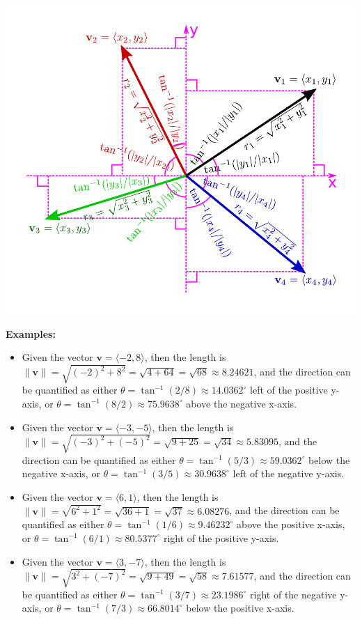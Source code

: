 \documentclass{article}
\begin{document}
\includegraphics[width = \textwidth]{cartesian_vector_to_polar_vector}

\textbf{Examples:}
\begin{itemize}
\item Given the vector \(\mathbf{v} = \langle -2, 8 \rangle\), then the length is \(\|\mathbf{v}\| = \sqrt{(-2)^2 + 8^2} = \sqrt{4 + 64} = \sqrt{68} \approx 8.24621\), and the direction can be quantified as either \(\theta = \tan^{-1}(2/8) \approx 14.0362^\circ\) left of the positive y-axis, or \(\theta = \tan^{-1}(8/2) \approx 75.9638^\circ\) above the negative x-axis.
\item Given the vector \(\mathbf{v} = \langle -3, -5 \rangle\), then the length is \(\|\mathbf{v}\| = \sqrt{(-3)^2 + (-5)^2} = \sqrt{9 + 25} = \sqrt{34} \approx 5.83095\), and the direction can be quantified as either \(\theta = \tan^{-1}(5/3) \approx 59.0362^\circ\) below the negative x-axis, or \(\theta = \tan^{-1}(3/5) \approx 30.9638^\circ\) left of the negative y-axis.
\item Given the vector \(\mathbf{v} = \langle 6, 1 \rangle\), then the length is \(\|\mathbf{v}\| = \sqrt{6^2 + 1^2} = \sqrt{36 + 1} = \sqrt{37} \approx 6.08276\), and the direction can be quantified as either \(\theta = \tan^{-1}(1/6) \approx 9.46232^\circ\) above the positive x-axis, or \(\theta = \tan^{-1}(6/1) \approx 80.5377^\circ\) right of the positive y-axis.
\item Given the vector \(\mathbf{v} = \langle 3, -7 \rangle\), then the length is \(\|\mathbf{v}\| = \sqrt{3^2 + (-7)^2} = \sqrt{9 + 49} = \sqrt{58} \approx 7.61577\), and the direction can be quantified as either \(\theta = \tan^{-1}(3/7) \approx 23.1986^\circ\) right of the negative y-axis, or \(\theta = \tan^{-1}(7/3) \approx 66.8014^\circ\) below the positive x-axis.
\end{itemize}
\end{document}
